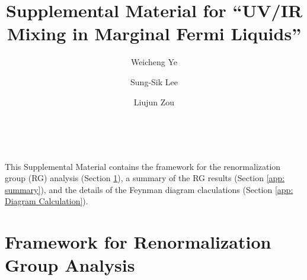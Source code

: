 \documentclass[prx,amsmath,amssymb, notitlepage, onecolumn,
nofootinbib,
superscriptaddress,
longbibliography
]{revtex4-1}
\begin{document}
\title{Supplemental Material for ``UV/IR Mixing in Marginal Fermi Liquids''}
	
\author{Weicheng Ye}

\author{Sung-Sik Lee}

\author{Liujun Zou}


\maketitle

\tableofcontents\

This Supplemental Material contains the framework for the renormalization group (RG) analysis (Section \ref{app: framework}), a summary of the RG results (Section \ref{app: summary}), and the details of the Feynman diagram claculations (Section \ref{app: Diagram Calculation}).



\section{Framework for Renormalization Group Analysis}\label{app: framework}
\end{document}
